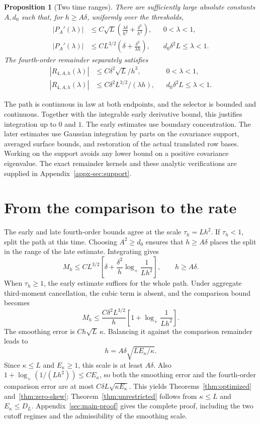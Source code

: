 \documentclass[11pt,letterpaper]{article}
\newtheorem{proposition}{Proposition}
\theoremstyle{remark}
\begin{document}
\begin{proposition}[Two time ranges]\label{an:prop:derivative}
There are sufficiently large absolute constants \(A,d_0\) such that,
for \(h\ge A\delta\), uniformly over the thresholds,
\begin{align}
 |P_A'(\lambda)|&\le C\sqrt L\left(
 \frac{\lambda\delta}{h^2}+\frac{\delta^2}{h^3}\right),
 &&0<\lambda<1,\label{an:early}\\
 |P_A'(\lambda)|&\le CL^{3/2}\left(
 \delta+\frac{\delta^2}{\lambda h}\right),
 &&d_0\delta^2L\le\lambda<1.\label{an:late}
\end{align}
The fourth-order remainder separately satisfies
\begin{align}
 |R_{4,A,h}(\lambda)|&\le C\delta^2\sqrt L/h^3,
 &&0<\lambda<1,\label{eq:remainder-early}\\
 |R_{4,A,h}(\lambda)|&\le C\delta^2L^{3/2}/(\lambda h),
 &&d_0\delta^2L\le\lambda<1.\label{an:remainder}
\end{align}
\end{proposition}
The path is continuous in law at both endpoints, and the selector is
bounded and continuous. Together with the integrable early derivative
bound, this justifies integration up to \(0\) and \(1\).
The early estimates use boundary concentration. The later estimates
use Gaussian integration by parts on the covariance support, averaged
surface bounds, and restoration of the actual translated row bases.
Working on the support avoids any lower bound on a positive covariance
eigenvalue. The exact remainder kernels and these analytic verifications
are supplied in Appendix~\ref{appx-sec:support}.


\section{From the comparison to the rate}
The early and late fourth-order bounds agree at the scale
\(\tau_h=Lh^2\). If \(\tau_h<1\), split the path at this time.
Choosing \(A^2\ge d_0\) ensures that \(h\ge A\delta\) places
the split in the range of the late estimate. Integrating gives
\[
 M_h\le CL^{3/2}\left[
 \delta+\frac{\delta^2}{h}\log_+\frac1{Lh^2}\right],
 \qquad h\ge A\delta.
\]
When \(\tau_h\ge1\), the early estimate suffices for the whole path.
Under aggregate third-moment cancellation, the cubic term is absent,
and the comparison bound becomes
\[
 M_h\le\frac{C\delta^2L^{3/2}}h
 \left[1+\log_+\frac1{Lh^2}\right].
\]
The smoothing error is \(Ch\sqrt L\,\kappa\). Balancing it against
the comparison remainder leads to
\[
 h=A\delta\sqrt{LE_\kappa/\kappa}.
\]
Since \(\kappa\le L\) and \(E_\kappa\ge1\), this scale is at
least \(A\delta\). Also
\(1+\log_+(1/(Lh^2))\le CE_\kappa\), so both the smoothing
error and the fourth-order comparison error are at most
\(C\delta L\sqrt{\kappa E_\kappa}\).
This yields Theorems~\ref{thm:optimized} and~\ref{thm:zero-skew};
Theorem~\ref{thm:unrestricted} follows from \(\kappa\le L\) and
\(E_\kappa\le D_L\). Appendix~\ref{sec:main-proof} gives the complete proof, including
the two cutoff regimes and the admissibility of the smoothing scale.
\end{document}
